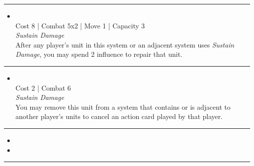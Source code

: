 \begin{multicols}{2}
\vspace{-10pt}\rule{\hsize}{0.4pt}\vspace{5pt}


\begin{itemize}
\item {}\\
Cost 8 | Combat 5x2 | Move 1 | Capacity 3 \\
\emph{Sustain Damage}\\
After any player's unit in this system or an adjacent system uses \emph{Sustain Damage}, you may spend 2 influence to repair that unit.
\end{itemize}

\vspace{-10pt}\rule{\hsize}{0.4pt}\vspace{5pt}


\begin{itemize}
\item {}
\\
Cost 2 | Combat 6 \\
\emph{Sustain Damage}\\
You may remove this unit from a system that contains or is adjacent to another player's units to cancel an action card played by that player.
\end{itemize}

\vspace{-10pt}\rule{\hsize}{0.4pt}\vspace{5pt}

\nounits

\columnbreak
{}

\begin{itemize}
\item \aetherstream
\item \voidwatch
\end{itemize}

\vspace{-10pt}\rule{\hsize}{0.4pt}\vspace{5pt}



\end{multicols}
